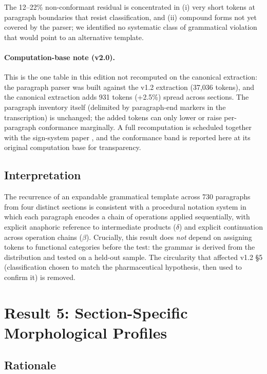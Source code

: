 \documentclass[11pt,a4paper]{article}
\begin{document}
The 12--22\% non-conformant residual is concentrated in (i) very short tokens at paragraph boundaries that resist classification, and (ii) compound forms not yet covered by the parser; we identified no systematic class of grammatical violation that would point to an alternative template.

\paragraph{Computation-base note (v2.0).} This is the one table in this edition not recomputed on the canonical extraction: the paragraph parser was built against the v1.2 extraction (37{,}036 tokens), and the canonical extraction adds 931 tokens (+2.5\%) spread across sections. The paragraph inventory itself (delimited by paragraph-end markers in the transcription) is unchanged; the added tokens can only lower or raise per-paragraph conformance marginally. A full recomputation is scheduled together with the sign-system paper \citep{Placa2026c}, and the conformance band is reported here at its original computation base for transparency.

\subsection{Interpretation}

The recurrence of an expandable grammatical template across 730 paragraphs from four distinct sections is consistent with a procedural notation system in which each paragraph encodes a chain of operations applied sequentially, with explicit anaphoric reference to intermediate products ($\delta$) and explicit continuation across operation chains ($\beta$). Crucially, this result does \textit{not} depend on assigning tokens to functional categories before the test: the grammar is derived from the distribution and tested on a held-out sample. The circularity that affected v1.2 \S5 (classification chosen to match the pharmaceutical hypothesis, then used to confirm it) is removed.

\section{Result 5: Section-Specific Morphological Profiles}

\subsection{Rationale}
\end{document}
